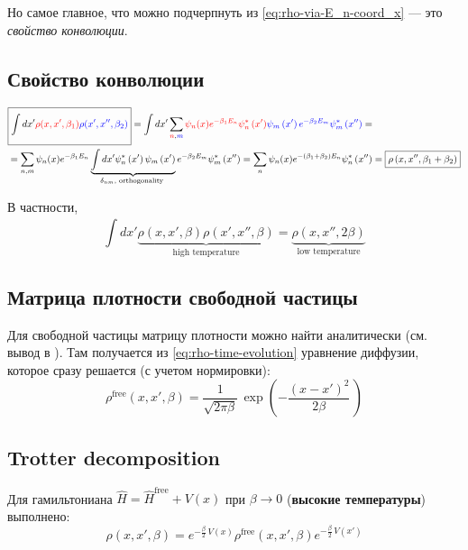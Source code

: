 \begin{lecture}
Но самое главное, что можно подчерпнуть из \eqref{eq:rho-via-E_n-coord_x} --- это \textit{свойство конволюции}.
\subsection{Свойство конволюции}
\begin{align}
    \label{eq:rho_convolution-derivation}
    \nonumber
    & \boxed{\int\limits_{}^{} dx' {\color{red}\rho(x, x', \beta_1)} {\color{blue}\rho(x', x'', \beta_2)}} =
    \int d x^{\prime} \sum_{{\color{red}n}, {\color{blue}m}} 
    {\color{red}\psi_{n}(x) e^{-\beta_{1} E_{n}} \psi_{n}^{*}\left(x^{\prime}\right)} 
    {\color{blue} \psi_{m}\left(x^{\prime}\right) e^{-\beta_{2} E_{m}} \psi_{m}^{*}\left(x^{\prime \prime}\right)} = \\
    & = \sum_{n, m} \psi_{n}(x) e^{-\beta_{1} E_{n}} \underbrace{\int d x^{\prime} \psi_{n}^{*}\left(x^{\prime}\right) \psi_{m}\left(x^{\prime}\right)}_{\delta_{n m}, \text { orthogonality }} e^{-\beta_{2} E_{m}} \psi_{m}^{*}\left(x^{\prime \prime}\right) = \sum_{n} \psi_{n}(x) e^{-\left(\beta_{1}+\beta_{2}\right) E_{n}} \psi_{n}^{*}\left(x^{\prime \prime}\right) =
    \boxed{\rho\left(x, x^{\prime \prime}, \beta_{1}+\beta_{2}\right)}
\end{align}

В частности,
\begin{equation}
    \label{eq:rho_convolution-2beta}
    \int\limits_{}^{} dx' \underbrace{\rho(x, x', \beta) \rho(x', x'', \beta)}_\text{high temperature} =
    \underbrace{\rho (x, x'', 2\beta)}_\text{low temperature}
\end{equation}

\subsection{Матрица плотности свободной частицы}
Для свободной частицы матрицу плотности можно найти аналитически (см. вывод в \cite{feynman}).
Там получается из \eqref{eq:rho-time-evolution} уравнение диффузии, которое сразу решается (с учетом нормировки):
\begin{equation}
    \label{eq:rho-free-particle}
    \rho^\text{free} (x, x', \beta) = \frac{1}{\sqrt{2\pi \beta}}\, \exp \left( -\frac{(x - x')^2}{2\beta}\, \right)  
\end{equation}

\subsection{Trotter decomposition}
Для гамильтониана $\hat{H} = \hat{H}^{\text{free}} + V(x)$ при $\beta \rightarrow 0$ (\textbf{высокие температуры}) выполнено:
\begin{equation}
    \label{eq:trotter-decomposition-definition}
    \rho (x, x', \beta) = e^{- \frac{\beta}{2}\, V(x)} \rho^{\text{free}} (x, x', \beta) e^{- \frac{\beta}{2}\, V(x')} 
\end{equation}


\end{lecture}
